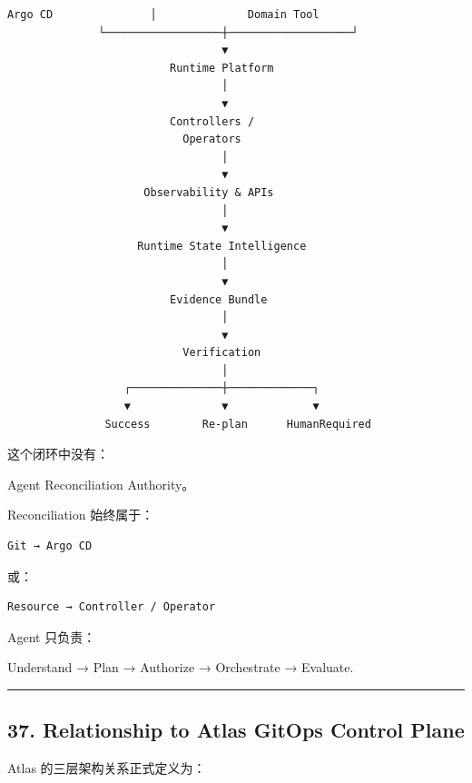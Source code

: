 \documentclass[11pt,a4paper]{article}
\begin{document}
\begin{lstlisting}[language=text]
           Argo CD               │              Domain Tool
              └──────────────────┼───────────────────┘
                                 ▼
                         Runtime Platform
                                 │
                                 ▼
                         Controllers /
                           Operators
                                 │
                                 ▼
                     Observability & APIs
                                 │
                                 ▼
                    Runtime State Intelligence
                                 │
                                 ▼
                         Evidence Bundle
                                 │
                                 ▼
                           Verification
                                 │
                  ┌──────────────┼─────────────┐
                  ▼              ▼             ▼
               Success        Re-plan      HumanRequired
\end{lstlisting}
这个闭环中没有：

\begin{gfmBlockquote}
Agent Reconciliation Authority。
\end{gfmBlockquote}
Reconciliation 始终属于：

\begin{lstlisting}[language=text]
Git → Argo CD
\end{lstlisting}
或：

\begin{lstlisting}[language=text]
Resource → Controller / Operator
\end{lstlisting}
Agent 只负责：

\begin{gfmBlockquote}
Understand → Plan → Authorize → Orchestrate → Evaluate.
\end{gfmBlockquote}
\vspace{0.5em}\hrule\vspace{0.5em}
\subsection{37. Relationship to Atlas GitOps Control Plane}
Atlas 的三层架构关系正式定义为：
\end{document}
